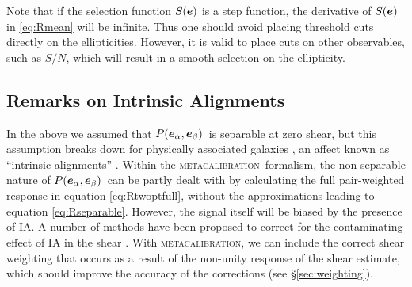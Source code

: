 \documentclass[iop]{emulateapj}
\newcommand{\snr}{$S/N$}
\newcommand{\vest}{\mbox{\boldmath $e$}}
\newcommand{\mcal}{\textsc{metacalibration}}
\newcommand{\probe}{\mbox{$P(\vest_\alpha, \vest_\beta)$}}
\begin{document}
Note that if the selection function $S(\vest)$ is a step function, the
derivative of $S(\vest)$ in \ref{eq:Rmean} will be infinite.  Thus one should
avoid placing threshold cuts directly on the ellipticities.  However, it is
valid to place cuts on other observables, such as \snr, which will result in a
smooth selection on the ellipticity.


\subsection{Remarks on Intrinsic Alignments} \label{sec:IA}

In the above we assumed that \probe\ is separable at zero shear, but this
assumption breaks down for physically associated galaxies
\citep[e.g.][]{HirataIntrinsicAlign07}, an affect known as ``intrinsic
alignments'' \citep[IA; for a recent review, see][]{TroxelIAReview2015}.
Within the \mcal\ formalism, the non-separable nature of \probe\ can be partly
dealt with by calculating the full pair-weighted response in equation
\ref{eq:Rtwoptfull}, without the approximations leading to equation
\ref{eq:Rseparable}.  However, the signal itself will be biased by the presence
of IA.  A number of methods  have been proposed to correct for the
contaminating effect of IA in the shear \citep{TroxelIAReview2015}.  With
\mcal, we can include the correct shear weighting that occurs as a result of
the non-unity response of the shear estimate, which should improve the accuracy
of the corrections (see \S \ref{sec:weighting}).
\end{document}
